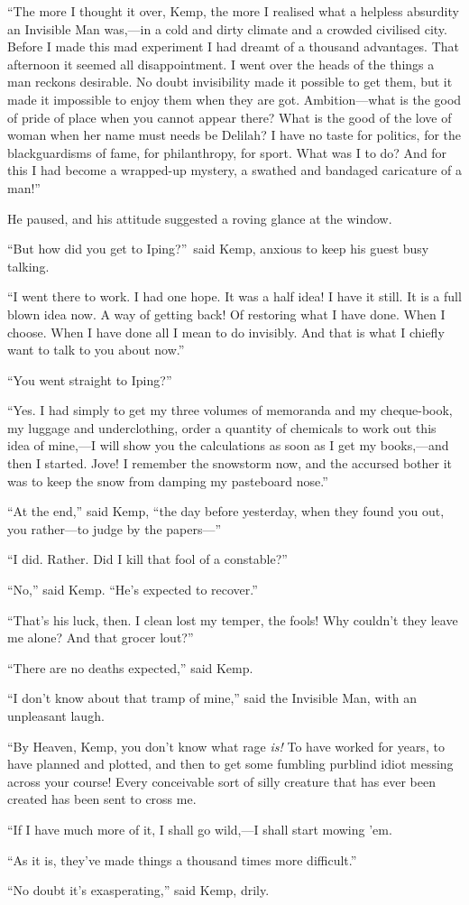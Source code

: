 “The more I thought it over, Kemp, the more I realised what a helpless absurdity an Invisible Man was,—in a cold and dirty climate and a crowded civilised city. Before I made this mad experiment I had dreamt of a thousand advantages. That afternoon it seemed all disappointment. I went over the heads of the things a man reckons desirable. No doubt invisibility made it possible to get them, but it made it impossible to enjoy them when they are got. Ambition—what is the good of pride of place when you cannot appear there? What is the good of the love of woman when her name must needs be Delilah? I have no taste for politics, for the blackguardisms of fame, for philanthropy, for sport. What was I to do? And for this I had become a wrapped-up mystery, a swathed and bandaged caricature of a man!”

He paused, and his attitude suggested a roving glance at the window.

“But how did you get to Iping?”\ said Kemp, anxious to keep his guest busy talking.

“I went there to work. I had one hope. It was a half idea! I have it still. It is a full blown idea now. A way of getting back! Of restoring what I have done. When I choose. When I have done all I mean to do invisibly. And that is what I chiefly want to talk to you about now.”

“You went straight to Iping?”

“Yes. I had simply to get my three volumes of memoranda and my cheque-book, my luggage and underclothing, order a quantity of chemicals to work out this idea of mine,—I will show you the calculations as soon as I get my books,—and then I started. Jove! I remember the snowstorm now, and the accursed bother it was to keep the snow from damping my pasteboard nose.”

“At the end,” said Kemp, “the day before yesterday, when they found you out, you rather—to judge by the papers—”

“I did. Rather. Did I kill that fool of a constable?”

“No,” said Kemp. “He’s expected to recover.”

“That’s his luck, then. I clean lost my temper, the fools! Why couldn’t they leave me alone? And that grocer lout?”

“There are no deaths expected,” said Kemp.

“I don’t know about that tramp of mine,” said the Invisible Man, with an unpleasant laugh.

“By Heaven, Kemp, you don’t know what rage \emph{is!} To have worked for years, to have planned and plotted, and then to get some fumbling purblind idiot messing across your course! Every conceivable sort of silly creature that has ever been created has been sent to cross me.

“If I have much more of it, I shall go wild,—I shall start mowing ’em.

“As it is, they’ve made things a thousand times more difficult.”

“No doubt it’s exasperating,” said Kemp, drily.